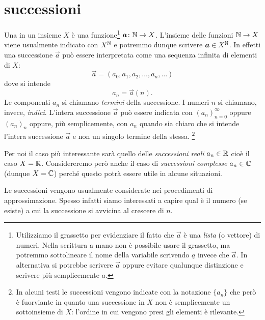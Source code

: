 \chapter{successioni}

Una  in un insieme $X$ è una
funzione\footnote{%
Utilizziamo il grassetto per evidenziare il fatto
che $\vec a$ è una \emph{lista} (o vettore) di numeri.
Nella scrittura a mano non è possibile usare il grassetto, ma potremmo
sottolineare il nome della variabile scrivendo $\underline a$ invece che $\vec a$.
In alternativa si potrebbe scrivere $\stackrel{\rightarrow}a$ oppure evitare
qualunque distinzione e scrivere più semplicemente $a$.}
$\boldsymbol a\colon \mathbb N \to X$.
L'insieme delle funzioni $\mathbb N \to X$ viene usualmente indicato
con $X^\mathbb N$ e potremmo dunque scrivere $\boldsymbol a \in X^\mathbb N$. In effetti una successione $\vec a$ può essere interpretata
come una sequenza infinita di elementi di $X$:
\[
  \vec a = (a_0, a_1, a_2, \dots, a_n, \dots )
\]
dove si intende
\[
   a_n = \vec a(n).
\]
Le componenti $a_n$ si chiamano \emph{termini} della successione.
I numeri $n$ si chiamano, invece, \emph{indici}.
L'intera
successione $\vec a$ può essere indicata con $(a_n)_{n=0}^\infty$
oppure $(a_n)_n$ oppure,
più semplicemente, con $a_n$ quando sia chiaro che si intende l'intera
successione $\vec a$ e non un singolo termine della stessa.%
\footnote{In alcuni testi le successioni vengono indicate
con la notazione $\{a_n\}$ che però è fuorviante in quanto
una successione in $X$ non è semplicemente un sottoinsieme di $X$:
l'ordine in cui vengono presi gli elementi è rilevante.}

Per noi il caso più interessante sarà quello delle \emph{successioni reali}
$a_n\in \mathbb R$ cioè il caso $X=\mathbb R$. Considereremo però anche il caso di
\emph{successioni complesse} $a_n\in \mathbb C$ (dunque $X=\mathbb C$) perché questo
potrà essere utile in alcune situazioni.

Le successioni vengono usualmente
considerate nei procedimenti di approssimazione.
Spesso infatti siamo interessati a capire qual è il numero (se esiste) a cui
la successione si avvicina al crescere di $n$.

